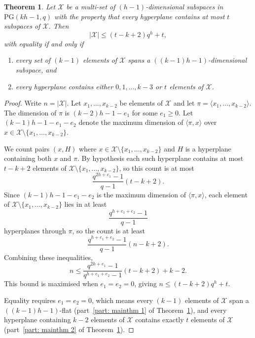 \documentclass[12pt, twoside]{article}
\newtheorem{theorem}{\bf Theorem}%
\begin{document}
	\begin{theorem} \label{mainthm}
		Let $\mathcal{X}$ be a multi-set of $(h-1)$-dimensional subspaces in $\mathrm{PG}(kh-1,q)$ with the property that every hyperplane contains at most $t$ subspaces of $\mathcal{X}$. Then
		\begin{equation} \label{eqn: maximal arc bound}
			|\mathcal{X}| \le (t-k+2)q^h+t,
		\end{equation}
		with equality if and only if
		\begin{enumerate}
			\item every set of $(k-1)$ elements of $\mathcal{X}$ spans a $((k-1)h-1)$-dimensional subspace, and \label{part: mainthm 1}
			\item every hyperplane contains either $0, 1, \ldots, k-3$ or $t$ elements of $\mathcal{X}$. \label{part: mainthm 2}
		\end{enumerate}
	\end{theorem}
	
	\begin{proof}
		Write $n=|\mathcal{X}|$. Let $x_1,\ldots,x_{k-2}$ be elements of $\mathcal{X}$ and let $\pi=\langle x_1,\ldots,x_{k-2} \rangle$. The dimension of $\pi$ is $(k-2)h-1-e_1$ for some $e_1 \ge 0$. Let $(k-1)h-1-e_1-e_2$ denote the maximum dimension of $\langle \pi, x \rangle$ over $x \in \mathcal{X} \setminus \{x_1,\ldots,x_{k-2}\}$.
		
		We count pairs $(x,H)$ where $x \in \mathcal{X} \setminus \{x_1,\ldots,x_{k-2}\}$ and $H$ is a hyperplane containing both $x$ and $\pi$. By hypothesis each such hyperplane contains at most $t-k+2$ elements of $\mathcal{X} \setminus \{x_1,\ldots,x_{k-2}\}$, so this count is at most
		$$
		\frac{q^{2h+e_1}-1}{q-1}(t-k+2).
		$$
		Since $(k-1)h-1-e_1-e_2$ is the maximum dimension of $\langle \pi, x \rangle$, each element of $\mathcal{X} \setminus \{x_1,\ldots,x_{k-2}\}$ lies in at least
		$$
		\frac{q^{h+e_1+e_2}-1}{q-1}
		$$
		hyperplanes through $\pi$, so the count is at least
		$$
		\frac{q^{h+e_1+e_2}-1}{q-1}(n-k+2).
		$$
		Combining these inequalities,
		$$
		n \le \frac{q^{2h+e_1}-1}{q^{h+e_1+e_2}-1}(t-k+2)+k-2.
		$$
		This bound is maximised when $e_1=e_2=0$, giving $n \le (t-k+2)q^h+t$.
		
		Equality requires $e_1=e_2=0$, which means every $(k-1)$ elements of $\mathcal{X}$ span a $((k-1)h-1)$-flat (part~\ref{part: mainthm 1} of Theorem~\ref{mainthm}), and every hyperplane containing $k-2$ elements of $\mathcal{X}$ contains exactly $t$ elements of $\mathcal{X}$ (part~\ref{part: mainthm 2} of Theorem~\ref{mainthm}).
	\end{proof}
	
\end{document}
